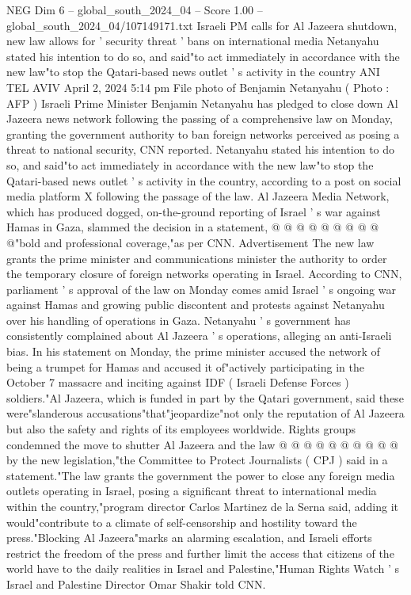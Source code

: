 \begin{textsample}{NEG Dim 6 – global\_south\_2024\_04 – Score 1.00 – global\_south\_2024\_04/107149171.txt}  \label{ex:f6_neg_333}
Israeli PM calls for Al Jazeera shutdown, new law allows for ' security threat ' bans on international media Netanyahu stated his intention to do so, and said"to act immediately in accordance with the new law"to stop the Qatari-based news outlet ' s activity in the country ANI TEL AVIV April 2, 2024 5:14 pm File photo of Benjamin Netanyahu ( Photo : AFP ) Israeli Prime Minister Benjamin Netanyahu has pledged to close down Al Jazeera news network following the passing of a comprehensive law on Monday, granting the government authority to ban foreign networks perceived as posing a threat to national security, CNN reported.
Netanyahu stated his intention to do so, and said"to act immediately in accordance with the new law"to stop the Qatari-based news outlet ' s activity in the country, according to a post on social media platform X following the passage of the law.
Al Jazeera Media Network, which has produced dogged, on-the-ground reporting of Israel ' s war against Hamas in Gaza, slammed the decision in a statement, @ @ @ @ @ @ @ @ @ @"bold and professional coverage,"as per CNN.
Advertisement The new law grants the prime minister and communications minister the authority to order the temporary closure of foreign networks operating in Israel.
According to CNN, parliament ' s approval of the law on Monday comes amid Israel ' s ongoing war against Hamas and growing public discontent and protests against Netanyahu over his handling of operations in Gaza.
Netanyahu ' s government has consistently complained about Al Jazeera ' s operations, alleging an anti-Israeli bias.
In his statement on Monday, the prime minister accused the network of being a trumpet for Hamas and accused it of"actively participating in the October 7 massacre and inciting against IDF ( Israeli Defense Forces ) soldiers."Al Jazeera, which is funded in part by the Qatari government, said these were"slanderous accusations"that"jeopardize"not only the reputation of Al Jazeera but also the safety and rights of its employees worldwide.
Rights groups condemned the move to shutter Al Jazeera and the law @ @ @ @ @ @ @ @ @ @ by the new legislation,"the Committee to Protect Journalists ( CPJ ) said in a statement."The law grants the government the power to close any foreign media outlets operating in Israel, posing a significant threat to international media within the country,"program director Carlos Martinez de la Serna said, adding it would"contribute to a climate of self-censorship and hostility toward the press."Blocking Al Jazeera"marks an alarming escalation, and Israeli efforts restrict the freedom of the press and further limit the access that citizens of the world have to the daily realities in Israel and Palestine,"Human Rights Watch ' s Israel and Palestine Director Omar Shakir told CNN.

\end{textsample}
